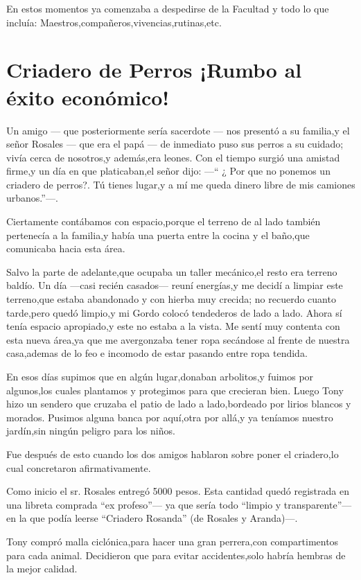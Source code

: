 \documentclass[letterpaper,12pt]{book}
\begin{document}
En estos momentos ya comenzaba a despedirse de la Facultad y todo lo que incluía: Maestros,compañeros,vivencias,rutinas,etc.

\chapter{Criadero de Perros ¡Rumbo al éxito económico!}
Un amigo --- que posteriormente sería sacerdote --- nos presentó a su familia,y el señor Rosales --- que era el papá --- de inmediato puso sus perros a su cuidado; vivía cerca de nosotros,y además,era leones. Con el tiempo surgió una amistad firme,y un día en  que platicaban,el señor dijo: ---`` ¿ Por que no ponemos un criadero de perros?. Tú tienes lugar,y a mí me queda dinero libre de mis camiones urbanos.''---.

Ciertamente contábamos con espacio,porque el terreno de al lado también pertenecía a la familia,y había una puerta entre la cocina y el baño,que comunicaba hacia esta área.

Salvo la parte de adelante,que ocupaba un taller mecánico,el resto era terreno baldío. Un día ---casi recién casados--- reuní energías,y me decidí a limpiar este terreno,que estaba abandonado y con hierba muy crecida; no recuerdo cuanto tarde,pero quedó limpio,y mi Gordo colocó tendederos de lado a lado. Ahora sí tenía espacio apropiado,y este no estaba a la vista. Me sentí muy contenta con esta nueva área,ya que me avergonzaba tener ropa secándose al frente de nuestra casa,ademas de lo feo e incomodo de estar pasando entre ropa tendida.

En esos días supimos que en algún lugar,donaban arbolitos,y fuimos por algunos,los cuales plantamos y protegimos para que crecieran bien. Luego Tony hizo un sendero que cruzaba el patio de lado a lado,bordeado por lirios blancos y morados. Pusimos alguna banca por aquí,otra por allá,y ya teníamos nuestro jardín,sin ningún peligro para los niños.

Fue después de esto cuando los dos amigos hablaron sobre poner el criadero,lo cual concretaron afirmativamente.

Como inicio el sr. Rosales entregó 5000 pesos. Esta cantidad quedó registrada en una libreta comprada ``ex profeso''--- ya que sería todo ``limpio y transparente''--- en la que podía leerse ``Criadero Rosanda'' (de Rosales y Aranda)---.

Tony compró malla ciclónica,para hacer una gran perrera,con compartimentos para cada animal. Decidieron que para evitar accidentes,solo habría hembras de la mejor calidad.
\end{document}
